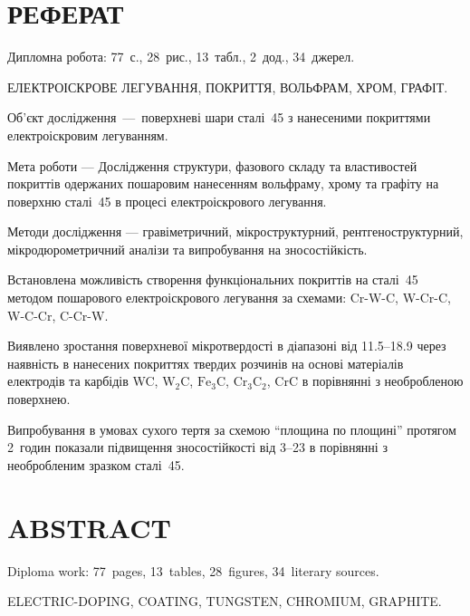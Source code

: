 \documentclass[a4paper,fontsize=14bp,ukrainian]{extreport}
\begin{document}
%
%


\setcounter{page}{4}

\chapter*{РЕФЕРАТ}
\thispagestyle{empty}
Дипломна робота: 77~с., 28~рис., 13~табл., 2~дод., 34~джерел.\vspace{5mm}

ЕЛЕКТРОІСКРОВЕ ЛЕГУВАННЯ, ПОКРИТТЯ, ВОЛЬФРАМ, ХРОМ, ГРАФІТ.\vspace{5mm}

Об'єкт дослідження~---~поверхневі шари сталі~45 з нанесеними покриттями електроіскровим легуванням.

Мета роботи --- Дослідження структури, фазового складу та властивостей покриттів одержаних пошаровим нанесенням вольфраму, хрому та графіту на поверхню сталі~45 в процесі електроіскрового легування.

Методи дослідження --- гравіметричний, мікроструктурний, рентгеноструктурний, мікродюрометричний аналізи та випробування на зносостійкість.

Встановлена можливість створення функціональних покриттів на сталі~45 методом пошарового електроіскрового легування за схемами: Cr-W-C, W-Cr-C, W-C-Cr, C-Cr-W.

Виявлено зростання поверхневої мікротвердості в діапазоні від \SIrange{11.5}{18.9}{\gpa} через наявність в нанесених покриттях твердих розчинів на основі матеріалів електродів та карбідів WC, $\text{W}_2\text{C}$, $\text{Fe}_{3}\text{C}$, $\text{Cr}_{3}\text{C}_{2}$, $\text{CrC}$ в порівнянні з необробленою поверхнею.

Випробування в умовах сухого тертя за схемою ``площина по площині'' протягом 2~годин показали підвищення зносостійкості від \SIrange{3}{23}{\mal} в порівнянні з необробленим зразком сталі~45.

\chapter*{ABSTRACT}
\thispagestyle{empty}
Diploma work:  77~pages,  13~tables,  28~figures,  34~literary sources. \vspace{5mm}

ELECTRIC-DOPING, COATING, TUNGSTEN, CHROMIUM, GRAPHITE. \vspace{5mm}
\end{document}

